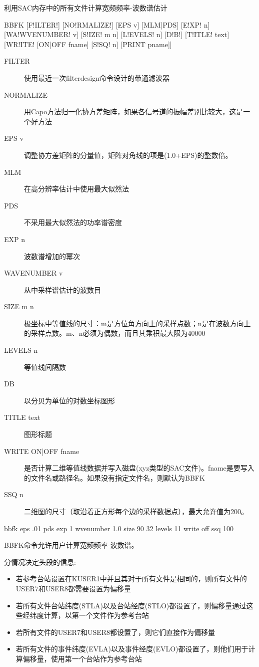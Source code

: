 \label{cmd:bbfk}

利用SAC内存中的所有文件计算宽频频率-波数谱估计

\begin{SACSTX}
BBFK [F!ILTER!] [NO!RMALIZE!] [EPS v] [MLM|PDS] [E!XP! n] [WA!WVENUMBER! v]
    [S!IZE! m n] [L!EVELS! n] [D!B!] [T!ITLE! text] [WR!ITE! [ON|OFF fname]
    [S!SQ! n] [PRINT pname]]
\end{SACSTX}

\begin{description}
\item [FILTER] 使用最近一次filterdesign命令设计的带通滤波器
\item [NORMALIZE] 用Capo方法归一化协方差矩阵，如果各信号道的振幅差别比较大，这是一个好方法
\item [EPS v] 调整协方差矩阵的分量值，矩阵对角线的项是(1.0+EPS)的整数倍。
\item [MLM] 在高分辨率估计中使用最大似然法
\item [PDS] 不采用最大似然法的功率谱密度
\item [EXP n] 波数谱增加的幂次
\item [WAVENUMBER v] 从中采样谱估计的波数目
\item [SIZE m n] 极坐标中等值线的尺寸：m是方位角方向上的采样点数；n是在波数方向上的采样点数。m、n必须为偶数，而且其乘积最大限为40000
\item [LEVELS n] 等值线间隔数
\item [DB] 以分贝为单位的对数坐标图形
\item [TITLE text] 图形标题
\item [WRITE ON|OFF fname] 是否计算二维等值线数据并写入磁盘(xyz类型的SAC文件)。fname是要写入的文件名或路径名。如果没有指定文件名，则默认为BBFK
\item [SSQ n] 二维图的尺寸（取沿着正方形每个边的采样数据点），最大允许值为200。
\end{description}

\begin{SACDFT}
bbfk eps .01 pds exp 1 wvenumber 1.0 size 90 32 levels 11 write off ssq 100
\end{SACDFT}

BBFK命令允许用户计算宽频频率-波数谱。

分情况决定头段的信息:
\begin{itemize}
\item 若参考台站设置在KUSER1中并且其对于所有文件是相同的，则所有文件的USER7和USER8都需要设置为偏移量
\item 若所有文件台站纬度(STLA)以及台站经度(STLO)都设置了，则偏移量通过这些经纬度计算，以第一个文件作为参考台站
\item 若所有文件的USER7和USER8都设置了，则它们直接作为偏移量
\item 若所有文件的事件纬度(EVLA)以及事件经度(EVLO)都设置了，则他们用于计算偏移量，使用第一个台站作为参考台站
\end{itemize}

